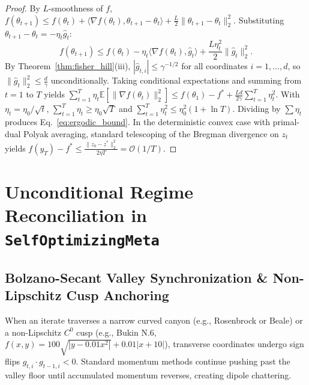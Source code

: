 \documentclass[10pt,twocolumn,letterpaper]{article}
\theoremstyle{definition}
\theoremstyle{remark}
\newcommand{\E}{\mathbb{E}}
\begin{document}
\begin{proof}
By $L$-smoothness of $f$, $f(\theta_{t+1}) \le f(\theta_t) + \langle \nabla f(\theta_t), \theta_{t+1} - \theta_t \rangle + \frac{L}{2}\|\theta_{t+1} - \theta_t\|_2^2$. Substituting $\theta_{t+1} - \theta_t = -\eta_t \hat{g}_t$:
\begin{equation*}
  f(\theta_{t+1}) \le f(\theta_t) - \eta_t \langle \nabla f(\theta_t), \hat{g}_t \rangle + \frac{L \eta_t^2}{2}\|\hat{g}_t\|_2^2.
\end{equation*}
By Theorem~\ref{thm:fisher_hill}(iii), $|\hat{g}_{t, i}| \le \gamma^{-1/2}$ for all coordinates $i=1,\dots,d$, so $\|\hat{g}_t\|_2^2 \le \frac{d}{\gamma}$ unconditionally. Taking conditional expectations and summing from $t=1$ to $T$ yields $\sum_{t=1}^T \eta_t \E[\|\nabla f(\theta_t)\|_2^2] \le f(\theta_1) - f^* + \frac{L d}{2\gamma}\sum_{t=1}^T \eta_t^2$. With $\eta_t = \eta_0 / \sqrt{t}$, $\sum_{t=1}^T \eta_t \ge \eta_0 \sqrt{T}$ and $\sum_{t=1}^T \eta_t^2 \le \eta_0^2(1 + \ln T)$. Dividing by $\sum \eta_t$ produces Eq.~\eqref{eq:ergodic_bound}. In the deterministic convex case with primal-dual Polyak averaging, standard telescoping of the Bregman divergence on $z_t$ yields $f(y_T) - f^* \le \frac{\|z_0 - z^*\|_2^2}{2\eta T} = \mathcal{O}(1/T)$.
\end{proof}

\section{Unconditional Regime Reconciliation in \texttt{SelfOptimizingMeta}}
\label{sec:reconciliation}

\subsection{Bolzano-Secant Valley Synchronization \& Non-Lipschitz Cusp Anchoring}

When an iterate traverses a narrow curved canyon (e.g., Rosenbrock or Beale) or a non-Lipschitz $C^0$ cusp (e.g., Bukin N.6, $f(x,y) = 100\sqrt{|y - 0.01x^2|} + 0.01|x+10|$), transverse coordinates undergo sign flips $g_{t,i}\cdot g_{t-1,i} < 0$. Standard momentum methods continue pushing past the valley floor until accumulated momentum reverses, creating dipole chattering.
\end{document}
